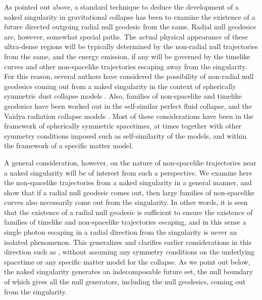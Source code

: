\documentclass[twocolumn,aps,amsmath,amssymb,prl,showpacs,preprintnumbers]
{revtex4}
\begin{document}
As pointed out above, a standard technique to deduce the 
development of a naked singularity in gravitational collapse has 
been to examine the existence of a future directed outgoing radial 
null geodesic from the same. Radial null geodesics are, however, 
somewhat special paths. The actual physical appearance of these 
ultra-dense regions will be typically determined by the non-radial null 
trajectories from the same, and the energy emission, if any will be governed 
by the timelike curves and other non-spacelike trajectories escaping 
away from the singularity. For this reason, several authors have 
considered the possibility of non-radial null geodesics coming out from 
a naked singularity in the context of spherically symmetric dust 
collapse models
\cite{dust}. 
Also, families of non-spacelike and timelike geodesics have been 
worked out in the self-similar perfect fluid collapse,
and the Vaidya radiation collapse models
\cite{JD}.
Most of these considerations have been in the framework of spherically 
symmetric spacetimes, at times together with other symmetry conditions imposed 
such as self-similarity of the models, and within the framework of a 
specific matter model. 


A general consideration, however, on the nature of non-spacelike 
trajectories near a naked singularity will be of interest from such 
a perspective. We examine here the non-spacelike trajectories from a 
naked singularity in a general manner, and show that if a radial null 
geodesic comes out, then large families of non-spacelike curves 
also necessarily come out from the singularity. In other words, it 
is seen that the existence of a radial null geodesic is sufficient to 
ensure the existence of families of timelike and non-spacelike trajectories 
escaping, and in this sense a single photon escaping in a radial 
direction from the singularity is never an isolated phenomenon. This 
generalizes and clarifies earlier considerations in this direction
such as 
\cite{dust}, 
without assuming any symmetry conditions on the underlying spacetime 
or any specific matter model for the collapse. As we point out below,
the naked singularity generates an indecomposable future set, the
null boundary of which gives all the null generators, including the
null geodesics, coming out from the singularity.
\end{document}
